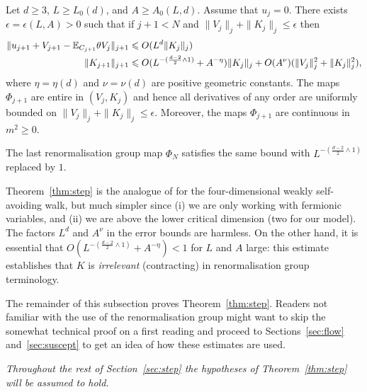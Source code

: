 \documentclass[11pt]{amsart}
\numberwithin{equation}{section}
\numberwithin{theorem}{section}
\newcommand{\1}{{\bf 1}}
\newcommand{\dplus}{(\frac{d-2}{2} \wedge 1)}
\begin{document}
\begin{theorem} \label{thm:step} Let $d \geq 3$, $L \geq L_0(d)$, and
  $A \geq A_0(L,d)$. Assume that $u_j=0$.  There exists
  $\epsilon = \epsilon(L,A)>0$ such that if $j+1<N$ and 
  $ \|V_j\|_j + \|K_j\|_j \leq \epsilon$ then
  \begin{align}
   \label{e:step-V}
     \|u_{j+1} + V_{j+1} - \E_{C_{j+1}}\theta V_j\|_{j+1} &\leq  O(L^d\|K_j\|_j)
      \\
      \label{e:step-K}
      \|K_{j+1}\|_{j+1} &\leq
                          O(L^{-\dplus}
                          +A^{-\eta})\|K_j\|_j
                          +
                          O(A^{\nu})(  \|V_j\|_j^2+\|K_j\|_j^2 ),
  \end{align}
  where $\eta=\eta(d)$ and $\nu=\nu(d)$ are positive geometric constants.
  The maps $\Phi_{j+1}$ are entire in $(V_j,K_j)$ 
  and hence all derivatives of any order are uniformly bounded on
  $\|V_j\|_j+\|K_j\|_j \leq \epsilon$. Moreover, the maps $\Phi_{j+1}$
  are continuous in $m^2 \geq 0$. 
  
  The last renormalisation group map $\Phi_{N}$
  satisfies the same bound with {$L^{-\dplus}$}  replaced by $1$. 
\end{theorem}

Theorem~\ref{thm:step} is the
analogue of \cite{MR3332941,MR3332942} for the four-dimensional weakly
self-avoiding walk, but much simpler since (i) we are only
working with fermionic variables, and (ii) we are above the lower
critical dimension (two for our model).  The factors $L^d$ and $A^\nu$ in the error
bounds are harmless.
On the other hand, it is essential that
$O(L^{-\dplus}+A^{-\eta}) < 1$ for $L$ and $A$ large: this estimate
establishes that $K$ is \emph{irrelevant} (contracting) in renormalisation
group terminology.

The remainder of this subsection proves Theorem~\ref{thm:step}.
Readers not familiar with the use of the renormalisation group might want to
skip the somewhat technical proof on a first reading and proceed to Sections~\ref{sec:flow}
and~\ref{sec:suscept} to get an idea of how these estimates are used.

\medskip

\emph{Throughout the rest of Section~\ref{sec:step} the hypotheses of
  Theorem~\ref{thm:step} will be assumed to hold.}
\medskip
\end{document}
